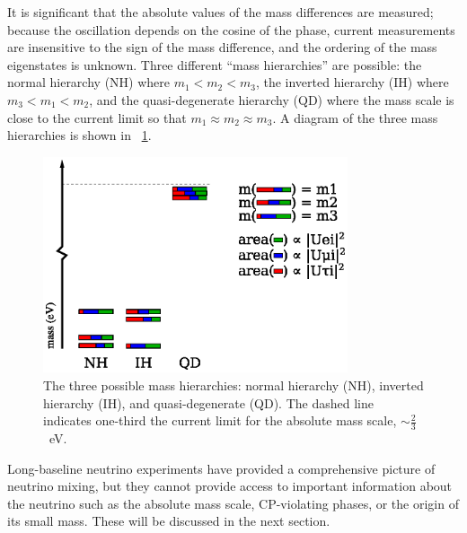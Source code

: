 It is significant that the absolute values of the mass differences are measured; because the oscillation depends on the cosine of the phase, current measurements are insensitive to the sign of the mass difference, and the ordering of the mass eigenstates is unknown.  Three different ``mass hierarchies'' are possible: the normal hierarchy (NH) where $m_1 < m_2 < m_3$, the inverted hierarchy (IH) where $m_3 < m_1 < m_2$, and the quasi-degenerate hierarchy (QD) where the mass scale is close to the current limit so that $m_1 \approx m_2 \approx m_3$.  A diagram of the three mass hierarchies is shown in {\fig}~\ref{fig:massScale}.
\begin{figure}[htp]
\centering
\includegraphics[width=0.8\textwidth]{figures/mass_scale.eps}
\caption[Neutrino mass hierarchies.]{The three possible mass hierarchies: normal hierarchy (NH), inverted hierarchy (IH), and quasi-degenerate (QD).  The dashed line indicates one-third the current limit for the absolute mass scale, $\sim\frac{2}{3}$~eV.}
\label{fig:massScale}
\end{figure}  

Long-baseline neutrino experiments have provided a comprehensive picture of neutrino mixing, but they cannot provide access to important information about the neutrino such as the absolute mass scale, CP-violating phases, or the origin of its small mass.  These will be discussed in the next section.


